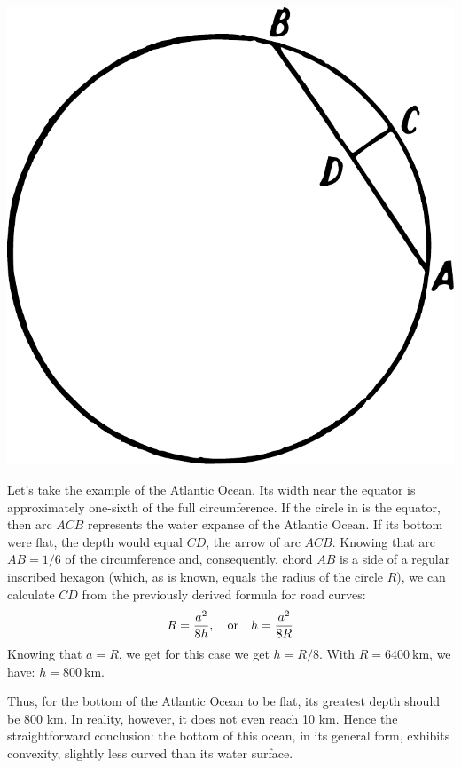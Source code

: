 \begin{marginfigure}%
\centering
\includegraphics[width=\textwidth]{figures/ch-04/fig-086.pdf}
\end{marginfigure}

Let's take the example of the Atlantic Ocean. Its width near the equator is approximately one-sixth of the full circumference. If the circle in  is the equator, then arc $ACB$ represents the water expanse of the Atlantic Ocean. If its bottom were flat, the depth would equal $CD$, the arrow of arc $ACB$. Knowing that arc $AB = 1/6$ of the circumference and, consequently, chord $AB$ is a side of a regular inscribed hexagon (which, as is known, equals the radius of the circle $R$), we can calculate $CD$ from the previously derived formula for road curves:
\begin{equation*}%
R = \frac{a^{2}}{8h}, \qor h = \frac{a^{2}}{8R}
\end{equation*}
Knowing that $a = R$, we get for this case we get $h = R/8$. With $R = \SI{6400}{\kilo\meter}$, we have: $h = \SI{800}{\kilo\meter}$.

Thus, for the bottom of the Atlantic Ocean to be flat, its greatest depth should be 800 km. In reality, however, it does not even reach 10 km. Hence the straightforward conclusion: the bottom of this ocean, in its general form, exhibits convexity, slightly less curved than its water surface.

